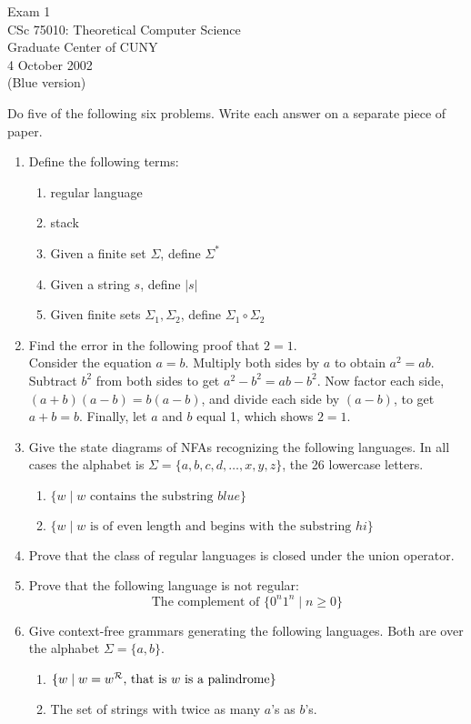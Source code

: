 \documentclass[11pt]{article}
\begin{document}
\begin{center}
	Exam 1\\
        	CSc 75010: Theoretical Computer Science\\
        	Graduate Center of CUNY\\
	4 October 2002\\
        	(Blue version)
\end{center}

Do five of the following six problems.  Write each answer on a separate
piece of paper.

\begin{enumerate}
	\item Define the following terms:
     	   \begin{enumerate}
		\item regular language
		\item stack
		\item Given a finite set $\Sigma$, define $\Sigma^*$
		\item Given a string $s$, define $|s|$
		\item Given finite sets $\Sigma_1, \Sigma_2$, 
			define $\Sigma_1 \circ \Sigma_2$
	   \end{enumerate}
   	\item Find the error in the following proof that $2=1$.\\
		Consider the equation $a=b$.  Multiply both sides by $a$ to obtain $a^2 = ab$.
		Subtract $b^2$ from both sides to get $a^2-b^2 = ab-b^2$.  Now factor each 
		side, $(a+b)(a-b) = b(a-b)$, and divide each side by $(a-b)$, to get $a+b=b$.
		Finally, let $a$ and $b$ equal 1, which shows $2=1$.
   	\item Give the state diagrams of NFAs recognizing the following languages.  In all
	    cases the alphabet is $\Sigma = \{a,b,c,d,\ldots,x,y,z\}$, the 26 lowercase letters.
	    \begin{enumerate}
		\item $\{w \mid w \mbox{ contains the substring $blue$}\}$
		\item $\{w \mid w \mbox{ is of even length and begins with the substring $hi$}\}$
	    \end{enumerate}
   	\item Prove that the class of regular languages is closed under the union operator.
   	\item Prove that the following language is not regular:
		$$
			\mbox{The complement of } \{ 0^n 1^n \mid n \geq 0\}
		$$

   	\item Give context-free grammars generating the following languages.  Both are over
		the alphabet $\Sigma = \{a,b\}$.
	  \begin{enumerate}
		\item $\{w \mid \mbox{$w=w^{\cal R}$, that is $w$ is a palindrome}\}$
		\item The set of strings with twice as many $a$'s as $b$'s.
	  \end{enumerate}
\end{enumerate}



 
\end{document}
